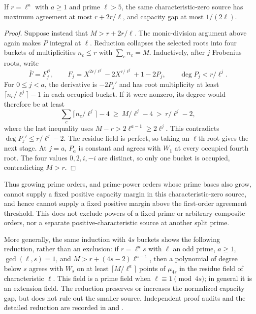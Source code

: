 \begin{corollary}\label{cor:ordinary-ca-prime-power-obstruction}
If $r=\ell^a$ with $a\ge1$ and prime $\ell>5$, the same
characteristic-zero source has maximum agreement at most
$r+2r/\ell$, and capacity gap at most $1/(2\ell)$.
\end{corollary}
\begin{proof}
Suppose instead that $M>r+2r/\ell$. The monic-division argument above
again makes $P$ integral at $\ell$. Reduction collapses the selected
roots into four buckets of multiplicities $n_c\le r$ with
$\sum_c n_c=M$. Inductively, after $j$ Frobenius roots, write
\[
 \overline F=F_j^{\ell^j},\qquad
 F_j=X^{2r/\ell^j}-2X^{r/\ell^j}+1-2P_j,
 \qquad \deg P_j<r/\ell^j.
\]
For $0\le j<a$, the derivative is $-2P_j'$ and has root multiplicity
at least $\lceil n_c/\ell^j\rceil-1$ in each occupied bucket.
If it were nonzero, its degree would therefore be at least
\[
 \sum_c\lceil n_c/\ell^j\rceil-4
 \ \ge\ M/\ell^j-4
 \ >\ r/\ell^j-2,
\]
where the last inequality uses
$M-r>2\ell^{a-1}\ge2\ell^j$.
This contradicts $\deg P_j'\le r/\ell^j-2$.
The residue field is perfect, so taking an $\ell$th root gives the
next stage. At $j=a$, $P_a$ is constant and agrees with $W_1$ at
every occupied fourth root. The four values $0,2,i,-i$ are distinct,
so only one bucket is occupied, contradicting $M>r$.
\end{proof}

Thus growing prime orders, and prime-power orders whose prime bases
also grow, cannot supply a fixed positive capacity margin in this
characteristic-zero source, and hence cannot supply a fixed positive
margin above the first-order agreement threshold. This does not exclude
powers of a fixed prime or arbitrary composite orders, nor a separate
positive-characteristic source at another split prime.

More generally, the same induction with $4s$ buckets shows the following
reduction, rather than an exclusion: if $r=\ell^a s$ with $\ell$ an odd prime, $a\ge1$,
$\gcd(\ell,s)=1$, and
$M>r+(4s-2)\ell^{a-1}$, then a polynomial of degree below $s$
agrees with $W_s$ on at least $\lceil M/\ell^a\rceil$ points of
$\mu_{4s}$ in the residue field of characteristic $\ell$.
This field is a prime field when $\ell\equiv1\pmod{4s}$;
in general it is an extension field. The reduction preserves or
increases the normalized capacity gap, but does not rule out the
smaller source. Independent proof audits and the detailed reduction
are recorded in
and
.

